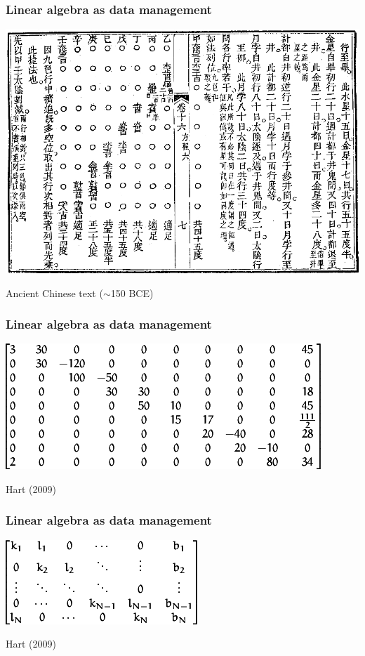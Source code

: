 \documentclass{beamer}
\numberwithin{exercise}{section}
\begin{document}
\begin{frame}
\frametitle{Linear algebra as data management}
\begin{center}
\includegraphics[scale=0.6]{fangcheng}
\end{center}
\footnotesize{Ancient Chinese text ($\sim$150 BCE)}
\end{frame}

\begin{frame}
\frametitle{Linear algebra as data management}
\begin{center}
\includegraphics[scale=0.6]{fangchengmodern}
\end{center}
\footnotesize{Hart (2009)}
\end{frame}

\begin{frame}
\frametitle{Linear algebra as data management}
\begin{center}
\includegraphics[scale=0.6]{fangchengmoderngeneral}
\end{center}
\footnotesize{Hart (2009)}
\end{frame}
\end{document}
